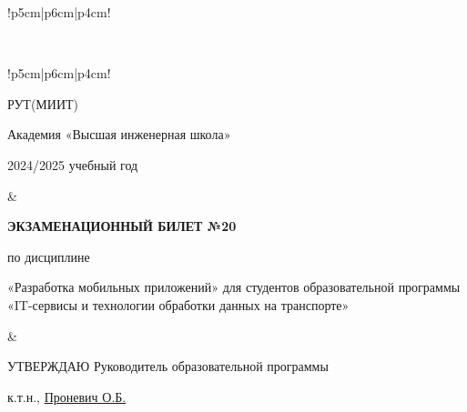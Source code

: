 \documentclass[a4paper]{article}
\begin{document}
\begin{tabular}{!{\vrule width 2pt}p{5cm}|p{6cm}|p{4cm}!{\vrule width 2pt}}
{\begin{minipage}{16cm}
\vspace{0.2cm}
    
\end{minipage}
}
\\
\end{tabular}

\newpage


\begin{tabular}{!{\vrule width 2pt}p{5cm}|p{6cm}|p{4cm}!{\vrule width 2pt}}

    {\centering 
    \fontsize{14pt}{16pt}\selectfont
    РУТ(МИИТ)

\vspace{14pt}

Академия «Высшая инженерная школа»

\vspace{14pt}

2024/2025 учебный год

    }
&
{
    \centering
\fontsize{14pt}{16pt}\selectfont

\textbf{ЭКЗАМЕНАЦИОННЫЙ
БИЛЕТ №20}


по дисциплине 

«Разработка мобильных приложений» 
\fontsize{12pt}{14pt}\selectfont
для студентов образовательной программы «IT-сервисы и технологии обработки данных на транспорте»

}
&
{
\centering
\fontsize{14pt}{16pt}\selectfont

УТВЕРЖДАЮ
Руководитель образовательной программы

\vspace{1cm}

\fontsize{12pt}{14pt}\selectfont
\underline{\hspace{3cm}}

к.т.н., \underline{Проневич О.Б.}

}
\\
\hline
{}
\end{tabular}
\end{document}
